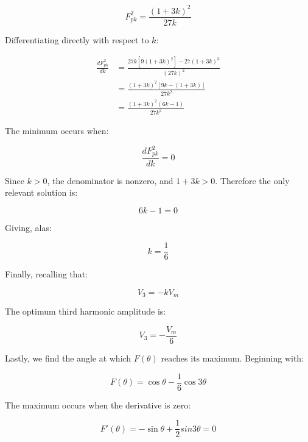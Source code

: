 \begin{equation}
    F_{pk}^2 = \frac{(1 + 3k)^2}{27k}
\end{equation}

Differentiating directly with respect to $k$:

\begin{align}
    \frac{dF_{pk}^2}{dk} 
    &= \frac{27k[9(1 + 3k)^2] - 27(1 + 3k)^3}{(27k)^2} \\[6pt]
    &= \frac{(1 + 3k)^2[9k - (1 + 3k)]}{27k^2} \\[6pt]
    &= \frac{(1 + 3k)^2(6k - 1)}{27k^2}
\end{align}

The minimum occurs when:

\begin{equation}
    \frac{dF_{pk}^2}{dk} = 0
\end{equation}

Since $k > 0$, the denominator is nonzero, and $1 + 3k > 0$. Therefore the only relevant solution is:

\begin{equation}
    6k - 1 = 0
\end{equation}

Giving, alas:

\begin{equation}
    k = \frac{1}{6}
\end{equation}

Finally, recalling that:

\begin{equation}
    V_3 = -kV_m
\end{equation}

The optimum third harmonic amplitude is:

\begin{equation}
    \boxed{V_3 = -\frac{V_m}{6}}
\end{equation}

Lastly, we find the angle at which $F(\theta)$ reaches its maximum. Beginning with:

\begin{equation}
    F(\theta) = \cos\theta - \frac{1}{6}\cos3\theta
\end{equation}

The maximum occurs when the derivative is zero:

\begin{equation}
    F'(\theta) = -\sin\theta + \frac{1}{2}sin3\theta = 0
\end{equation}

